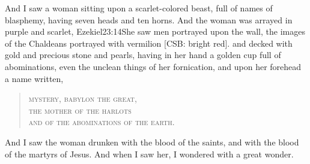 And I saw a woman sitting upon a scarlet-colored beast, full of names of blasphemy, having seven heads and ten horns. 
And the woman was arrayed in purple and scarlet,%
				{Ezekiel}{23:14}{She saw men portrayed upon the wall, the images of the Chaldeans portrayed with vermilion [CSB: bright red].} %
and decked with gold and precious stone and pearls,%
having in her hand a golden cup full of abominations, even the unclean things of her fornication, 
and upon her forehead a name written,%
\begin{verse}
\textsc{%
mystery, babylon the great,\\
the mother of the harlots\\
and of the abominations of the earth.%
}
\end{verse}
And I saw the woman drunken with the blood of the saints, and with the blood of the martyrs of Jesus. And when I saw her, I wondered with a great wonder. 

